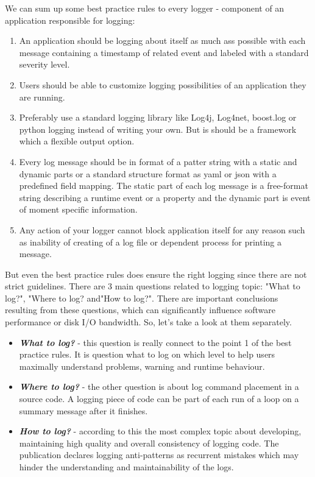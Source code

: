 We can sum up some best practice rules to every logger - component of an application responsible for logging:
\begin{enumerate}
    \item An application should be logging about itself as much ass possible with each message containing a timestamp of related event and labeled with a standard severity level.
    \item Users should be able to customize logging possibilities of an application they are running.
    \item Preferably use a standard logging library like Log4j, Log4net, boost.log or python logging instead of writing your own. But is should be a framework which a flexible output option.
    \item Every log message should be in format of a patter string with a static and dynamic parts or a standard structure format as yaml or json with a predefined field mapping. The static part of each log message is a free-format string describing a runtime event or a property and the dynamic part is event of moment specific information.
    \item Any action of your logger cannot block application itself for any reason such as inability of creating of a log file or dependent process for printing a message.
\end{enumerate}

But even the best practice rules does ensure the right logging since there are not strict guidelines. There are 3 main questions related to logging topic: "What to log?", "Where to log? and"How to log?". There are important conclusions resulting from these questions, which can significantly influence software performance or disk I/O bandwidth. So, let's take a look at them separately.

\begin{itemize}
    \item \textbf{\textit{What to log?}} - this question is really connect to the point 1 of the best practice rules. It is question what to log on which level to help users maximally understand problems, warning and runtime behaviour. 
    \item \textbf{\textit{Where to log?}} - the other question is about log command placement in a source code. A logging piece of code can be part of each run of a loop on a summary message after it finishes. 
    \item \textbf{\textit{How to log?}} - according to \cite{chen2017characterizing} this the most complex topic about developing, maintaining high quality and overall consistency of logging code. The publication declares logging anti-patterns as recurrent mistakes which may hinder the understanding and maintainability of the logs.
\end{itemize}


